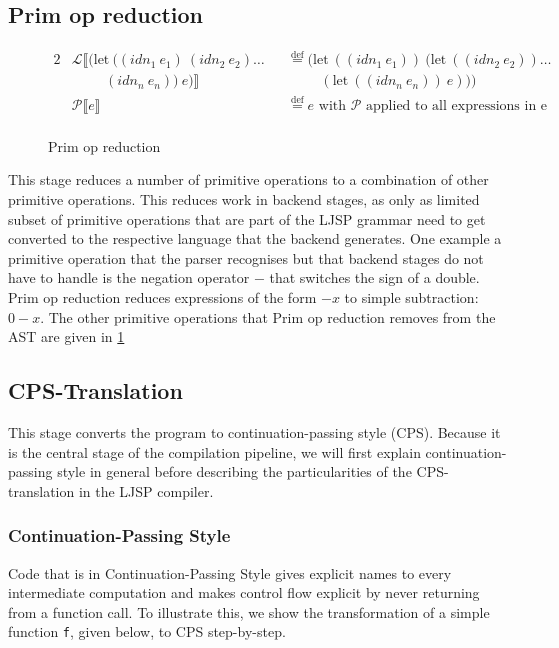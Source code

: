\documentclass[11pt]{report}
\newcommand{\eqdef}{\stackrel{\text{def}}{=}}%
\begin{document}
\subsection{Prim op reduction}
\begin{figure}[ht]
\begin{alignat*}{2}
&\mathcal{L}\llbracket (\text{let}\ ((idn_1\ e_1)\ (idn_2\ e_2)\dots &&\eqdef (\text{let}\ ((idn_1\ e_1))\ (\text{let}\ ((idn_2\ e_2)) \dots \\
&\hspace{1cm} (idn_n\ e_n))\ e)\rrbracket &&\hspace{1cm}(\text{let}\ ((idn_n\ e_n))\ e)))\\
&\mathcal{P}\llbracket e \rrbracket && \eqdef e\text{ with $\mathcal{P}$ applied to all expressions in e}\\
\end{alignat*}
\caption{Prim op reduction}
\label{primopreduction}
\end{figure}
This stage reduces a number of primitive operations to a combination of other primitive operations. This reduces work in backend stages, as only as limited subset of primitive operations that are part of the LJSP grammar need to get converted to the respective language that the backend generates. One example a primitive operation that the parser recognises but that backend stages do not have to handle is the negation operator $-$ that switches the sign of a double. Prim op reduction reduces expressions of the form $-x$ to simple subtraction: $0-x$. The other primitive operations that Prim op reduction removes from the AST are given in \ref{primopreduction}
\subsection{CPS-Translation}
This stage converts the program to continuation-passing style (CPS). Because it is the central stage of the compilation pipeline, we will first explain continuation-passing style in general before describing the particularities of the CPS-translation in the LJSP compiler.

\subsubsection{Continuation-Passing Style}
Code that is in Continuation-Passing Style gives explicit names to every intermediate computation and makes control flow explicit by never returning from a function call.\cite{sysftal}\cite{appel} To illustrate this, we show the transformation of a simple function \texttt{f}, given below, to CPS step-by-step.
\end{document}
